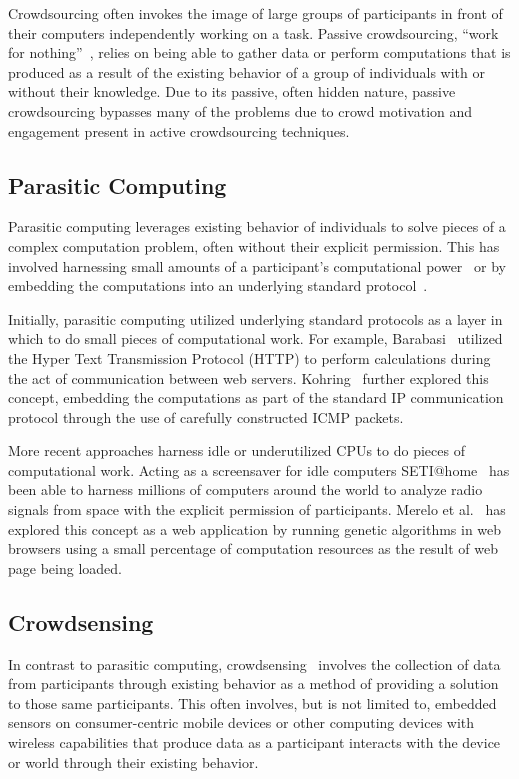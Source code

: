 \documentclass[10pt,twocolumn]{article}
\begin{document}
Crowdsourcing often invokes the image of large groups of participants in 
front of their computers independently working on a task. Passive 
crowdsourcing, ``work for nothing''~\cite{Adar2011}, relies on being able 
to gather data or perform computations that is produced as a result of 
the existing behavior of a group of individuals with or without their 
knowledge. Due to its passive, often hidden nature, passive crowdsourcing 
bypasses many of the problems due to crowd motivation and engagement 
present in active crowdsourcing techniques.


\subsection{Parasitic Computing~\cite{Barabasi2001}}
\label{sec:parastici-computing}
Parasitic computing leverages existing behavior of individuals to 
solve pieces of a complex computation problem, often without their
explicit permission. This has involved harnessing small amounts of
a participant's computational 
power~\cite{Anderson2002,Merelo2007,Merelo-Guervos2008} or by 
embedding the computations into an underlying standard 
protocol~\cite{Barabasi2001,Kohring2003}.

Initially, parasitic computing utilized underlying standard protocols
as a layer in which to do small pieces of computational work. For 
example, Barabasi~\cite{Barabasi2001} utilized the Hyper Text 
Transmission Protocol (HTTP) to perform calculations during the act 
of communication between web servers. Kohring~\cite{Kohring2003}
further explored this concept, embedding the computations as part of 
the standard IP communication protocol through the use of carefully
constructed ICMP packets.

More recent approaches harness idle or underutilized CPUs to do
pieces of computational work. Acting as a screensaver for idle 
computers SETI@home~\cite{Anderson2002} has been able to harness 
millions of computers around the world to analyze radio signals 
from space with the explicit permission of participants. Merelo 
et al.~\cite{Merelo2007,Merelo-Guervos2008} has explored this 
concept as a web application by running genetic algorithms in web 
browsers using a small percentage of computation resources as the 
result of web page being loaded.


\subsection{Crowdsensing}
\label{sec:crowdsensing}
In contrast to parasitic computing, crowdsensing~\cite{Ganti2011} 
involves the collection of data from participants through existing 
behavior as a method of providing a solution to those same participants.
This often involves, but is not limited to, embedded sensors on 
consumer-centric mobile devices or other computing devices with wireless 
capabilities that produce data as a participant interacts with the device 
or world through their existing behavior.
\end{document}
